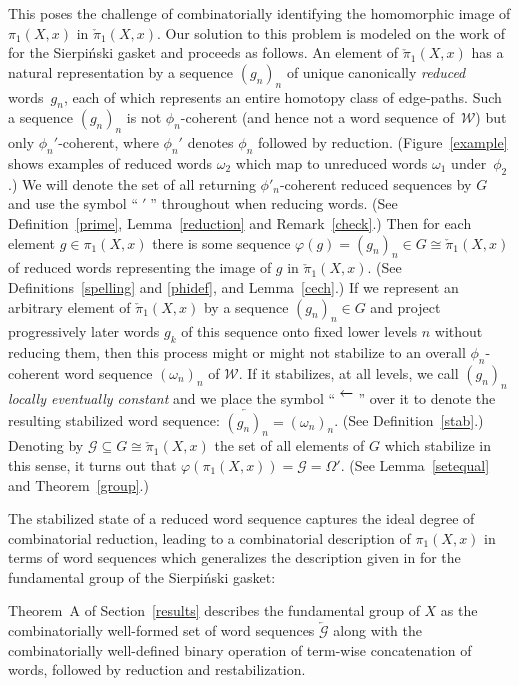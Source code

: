 \documentclass{amsart}
\theoremstyle{definition}
\theoremstyle{remark}
\numberwithin{equation}{section}
\begin{document}
This poses the challenge of combinatorially identifying the homomorphic image of $\pi_1(X,x)$ in $\check{\pi}_1(X,x)$.
 Our solution to this problem is modeled on the work of \cite{ADTW} for the Sierpi\'nski gasket and proceeds as follows.
An element of $\check{\pi}_1(X,x)$ has a natural representation by a sequence $(g_n)_n$ of unique canonically {\sl reduced} words~$g_n$, each of which represents an entire homotopy class of edge-paths. Such a sequence  $(g_n)_n$ is not $\phi_n$-coherent (and hence not a word sequence of~${\mathcal W}$) but only $\phi_n'$-coherent, where $\phi_n'$ denotes $\phi_n$ followed by reduction. (Figure~\ref{example} shows  examples of reduced words $\omega_2$ which map to unreduced words $\omega_1$ under~$\phi_2$.)
We will denote the set of all  returning $\phi'_n$-coherent reduced sequences by $G$ and use the symbol ``$\;'\;$'' throughout when reducing words. (See Definition~\ref{prime}, Lemma~\ref{reduction} and Remark~\ref{check}.) Then for each element $g\in \pi_1(X,x)$ there is  some
 sequence $\varphi(g)=(g_n)_n\in G\cong\check{\pi}_1(X,x)$ of reduced words representing the image of $g$ in $\check{\pi}_1(X,x)$. (See Definitions~\ref{spelling} and \ref{phidef},  and Lemma~\ref{cech}.)
 If we represent an arbitrary element of $\check{\pi}_1(X,x)$ by a sequence $(g_n)_n\in G$ and project  progressively later words $g_k$ of this sequence  onto fixed lower levels $n$ without reducing them, then this process might or might not stabilize to an overall $\phi_n$-coherent word sequence $(\omega_n)_n$ of ${\mathcal W}$. If it stabilizes, at all levels, we call $(g_n)_n$ {\em locally eventually constant} and we place the symbol ``$\;\overleftarrow{\mbox{\raisebox{5pt}{\hspace{10pt}}}}\;$'' over it to denote the resulting stabilized word sequence: $\overleftarrow{(g_n)_n}=(\omega_n)_n$. (See Definition~\ref{stab}.)
Denoting by ${\mathcal G}\subseteq G\cong\check{\pi}_1(X,x)$  the set of all elements  of $G$ which stabilize in this sense, it turns out that $\varphi(\pi_1(X,x))={\mathcal G}=\Omega'$. (See Lemma~\ref{setequal} and Theorem~\ref{group}.)

The stabilized state of a reduced word sequence captures the ideal degree of combinatorial reduction, leading to a combinatorial description of $\pi_1(X,x)$ in terms of word sequences which generalizes the description given in \cite{ADTW} for the fundamental group of the Sierpi\'nski gasket:

Theorem~A of Section~\ref{results} describes the fundamental group of $X$  as the combinatorially well-formed set of word sequences $\overleftarrow{\mathcal G}$ along with the combinatorially well-defined binary operation of term-wise concatenation of words, followed by reduction and restabilization.
\end{document}
